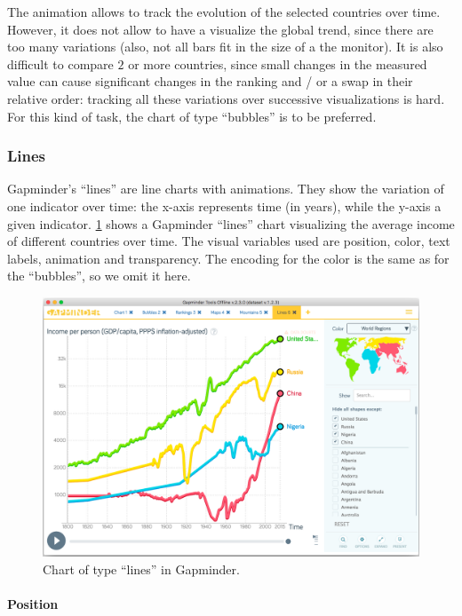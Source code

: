 The animation allows to track the evolution of the selected countries over time.
However, it does not allow to have a visualize the global trend, since there are too many variations (also, not all bars fit in the size of a the monitor).
It is also difficult to compare $2$ or more countries, since small changes in the measured value can cause significant changes in the ranking and / or a swap in their relative order: tracking all these variations over successive visualizations is hard.
For this kind of task, the chart of type ``bubbles'' is to be preferred.


\subsubsection{Lines}
Gapminder's ``lines'' are line charts with animations.
They show the variation of one indicator over time:
the x-axis represents time (in years), while the y-axis a given indicator.
\cref{fig:lines} shows a Gapminder ``lines'' chart visualizing the average income of different countries over time.
The visual variables used are position, color, text labels, animation and transparency.
The encoding for the color is the same as for the ``bubbles'', so we omit it here.

\begin{figure}[h]
	\centering
	\includegraphics[width=0.95\columnwidth]{figures/lines}
	\caption{Chart of type ``lines'' in Gapminder.}
	\label{fig:lines}
\end{figure}

\paragraph{Position}

